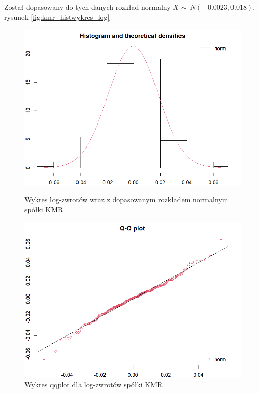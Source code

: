 \documentclass[a4paper,11pt]{article}
\begin{document}
Został dopasowany do tych danych rozkład normalny $X \sim\ N(-0.0023, 0.018)$, rysunek \ref{fig:kmr_histwykres_log}

\begin{figure}[!htb]
    \begin{minipage}{0.45\textwidth}
        \centering
        \includegraphics[width=\linewidth]{images/kmr_histW_log.png}
        \caption{Wykres log-zwrotów wraz z dopasowanym rozkładem normalnym spółki KMR}
        \label{fig:kmr_histwykres_log}
    \end{minipage}\hspace{0.05\textwidth}%
    \begin{minipage}{0.45\textwidth}
        \centering
        \includegraphics[width=\linewidth]{images/kmr_qqplot_log.png}
        \caption{Wykres qqplot dla log-zwrotów spółki KMR}
        \label{fig:kmr_qqplot_log}
    \end{minipage}


\end{figure}
\end{document}
